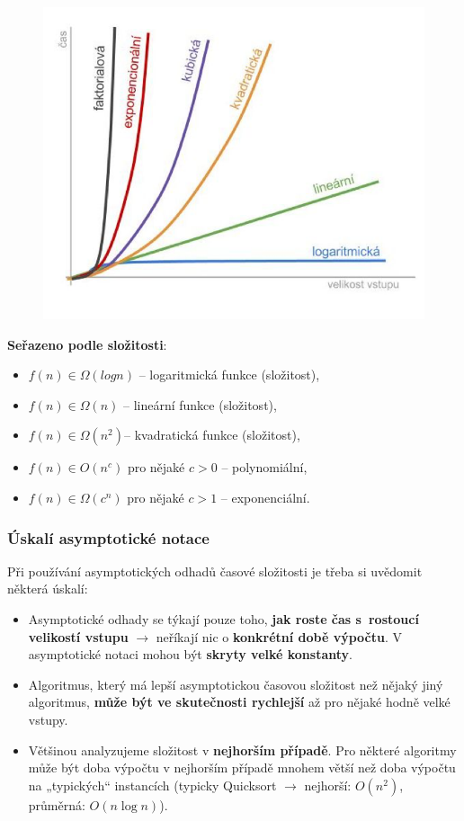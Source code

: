 \begin{minipage}{0.4\textwidth}
\begin{figure}[H]
	\centering
	\includegraphics[width=\textwidth]{assets/asympt}
\end{figure}
\end{minipage}
\begin{minipage}{0.6\textwidth}
\textbf{Seřazeno podle složitosti}:
\small
\begin{itemize}
\item $f(n) \in \Omega(log n)$ -- logaritmická funkce (složitost),
\item $f(n) \in \Omega(n)$ -- lineární funkce (složitost),
\item $f(n) \in \Omega(n^2)$-- kvadratická funkce (složitost),
\item $f(n) \in O(n^c)$ pro nějaké $c > 0$ -- polynomiální,
\item $f(n) \in \Omega(c^n)$ pro nějaké $c > 1$ -- exponenciální.
\end{itemize}
\end{minipage}

\subsubsection{Úskalí asymptotické notace}
Při používání asymptotických odhadů časové složitosti je třeba si uvědomit některá úskalí:
\begin{itemize}
	\item Asymptotické odhady se týkají pouze toho,\textbf{ jak roste čas s rostoucí velikostí vstupu} $\rightarrow$ neříkají nic o \textbf{konkrétní době výpočtu}. V asymptotické notaci mohou být \textbf{skryty velké konstanty}.
	\item Algoritmus, který má lepší asymptotickou časovou složitost než nějaký jiný algoritmus, \textbf{může být ve skutečnosti rychlejší} až pro nějaké hodně velké vstupy.
	\item Většinou analyzujeme složitost v \textbf{nejhorším případě}. Pro některé algoritmy může být doba výpočtu v nejhorším případě mnohem větší než doba výpočtu na „typických“ instancích (typicky Quicksort $\rightarrow$ nejhorší: $O(n^2)$, průměrná: $O(n \log n)$).
\end{itemize}

